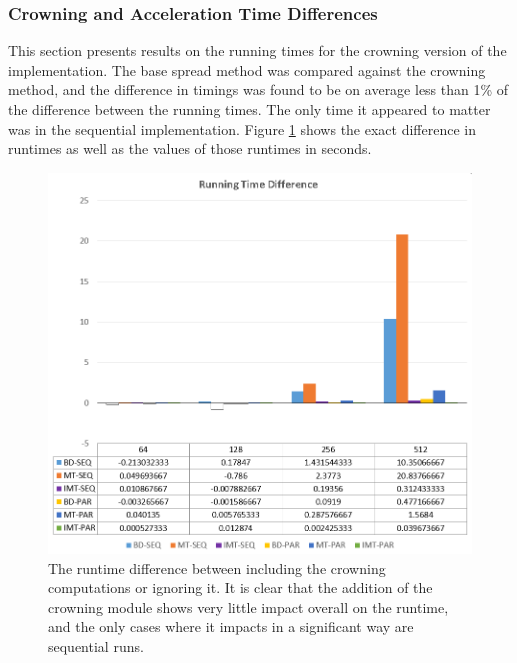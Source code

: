 \subsubsection{Crowning and Acceleration Time Differences}
This section presents results on the running times for the crowning version of the implementation. The base spread method was compared against the crowning method, and the difference in timings was found to be on average less than 1\% of the difference between the running times. The only time it appeared to matter was in the sequential implementation. Figure \ref{fig:runtime_diff} shows the exact difference in runtimes as well as the values of those runtimes in seconds. 
\begin{figure}%
\centering
  \includegraphics[width=\textwidth]{figures/results/runtime_diff.png}
  \caption{The runtime difference between including the crowning computations or ignoring it. It is clear that the addition of the crowning module shows very little impact overall on the runtime, and the only cases where it impacts in a significant way are sequential runs.}
  \label{fig:runtime_diff}
\end{figure}
 
